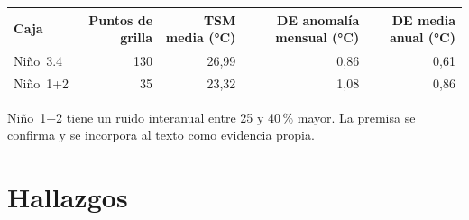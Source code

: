 \begin{center}\small
\begin{tabular}{@{}lrrrr@{}}
\toprule
Caja & Puntos de grilla & TSM media (°C) & DE anomalía mensual (°C) & DE media anual (°C) \\
\midrule
Niño~3.4 & 130 & 26{,}99 & 0{,}86 & 0{,}61 \\
Niño~1+2 & 35 & 23{,}32 & 1{,}08 & 0{,}86 \\
\bottomrule
\end{tabular}
\end{center}

Niño~1+2 tiene un ruido interanual entre 25 y 40\,\% mayor. La premisa se confirma y se incorpora al texto como evidencia propia.

\section{Hallazgos}

